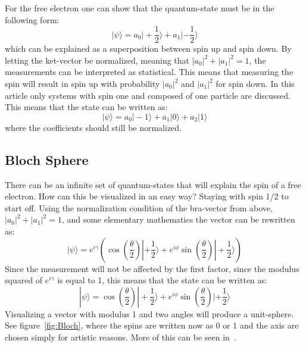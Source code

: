 For the free electron one can show that the quantum-state must be in the following form: $$|\psi\rangle=a_0|+\frac{1}{2}\rangle+a_1|-\frac{1}{2}\rangle$$ which can be explained as a superposition between spin up and spin down.
By letting the ket-vector be normalized, meaning that $|a_0|^2+|a_1|^2=1$, the measurements can be interpreted as statistical. This means that measuring the spin will result in spin up with probability $|a_0|^2$ and $|a_1|^2$ for spin down.  In this article only systems with spin one and composed of one particle are discussed. This means that the state can be written as: $$|\psi\rangle=a_0|-1\rangle+a_1|0\rangle+a_2|1\rangle$$ where the coefficients should still be normalized. 
\subsection{Bloch Sphere}\label{Bloch Sphere}
There can be an infinite set of quantum-states that will explain the spin of a free electron. How can this be visualized in an easy way? Staying with spin 1/2 to start off. Using the normalization condition of the bra-vector from above, $|a_0|^2+|a_1|^2=1$, and some elementary mathematics the vector can be rewritten as:
$$|\psi\rangle=e^{i\gamma}(\cos(\frac{\theta}{2})|+\frac{1}{2}\rangle+e^{i\phi}\sin(\frac{\theta}{2})|+\frac{1}{2}\rangle)$$
Since the measurement will not be affected by the first factor, since the modulus squared of $e^{i\gamma}$ is equal to 1, this means that the state can be written as:
$$|\psi\rangle=\cos(\frac{\theta}{2})|+\frac{1}{2}\rangle+e^{i\phi}\sin(\frac{\theta}{2})|+\frac{1}{2}\rangle$$
Visualizing a vector with modulus 1 and two angles will produce a unit-sphere. See figure~\ref{fig:Bloch}, where the spins are written now as 0 or 1 and the axis are chosen simply for artistic reasons. More of this can be seen in~\cite{Nielsen:2010}.
